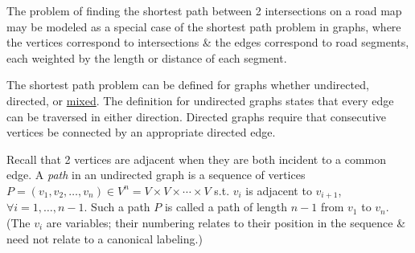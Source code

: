 \documentclass[oneside]{book}
\begin{document}
The problem of finding the shortest path between 2 intersections on a road map may be modeled as a special case of the shortest path problem in graphs, where the vertices correspond to intersections \& the edges correspond to road segments, each weighted by the length or distance of each segment.

The shortest path problem can be defined for graphs whether undirected, directed, or \href{https://en.wikipedia.org/wiki/Mixed_graph}{mixed}. The definition for undirected graphs states that every edge can be traversed in either direction. Directed graphs require that consecutive vertices be connected by an appropriate directed edge.

Recall that 2 vertices are adjacent when they are both incident to a common edge. A {\it path} in an undirected graph is a sequence of vertices $P = (v_1,v_2,\ldots,v_n)\in V^n = V\times V\times\cdots\times V$ s.t. $v_i$ is adjacent to $v_{i+1}$, $\forall i = 1,\ldots,n - 1$. Such a path $P$ is called a path of length $n - 1$ from $v_1$ to $v_n$. (The $v_i$ are variables; their numbering relates to their position in the sequence \& need not relate to a canonical labeling.)
\end{document}
